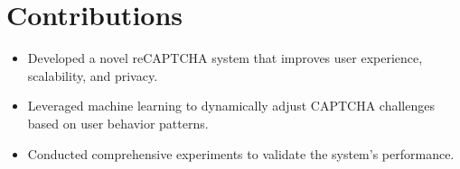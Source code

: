 \documentclass{article}
\begin{document}
\section{Contributions}
\begin{itemize}
    \item Developed a novel reCAPTCHA system that improves user experience, scalability, and privacy.
    \item Leveraged machine learning to dynamically adjust CAPTCHA challenges based on user behavior patterns.
    \item Conducted comprehensive experiments to validate the system's performance.
\end{itemize}
\end{document}
